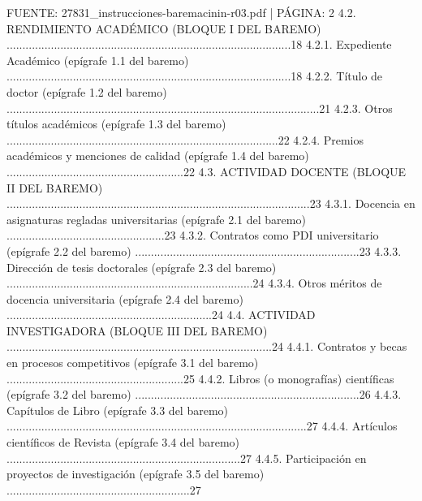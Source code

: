 \documentclass{article}
\begin{document}
\begin{itemize}
\begin{itemize}
\begin{scriptsize}
                  FUENTE: 27831\_instrucciones-baremacinin-r03.pdf | PÁGINA: 2
                  4.2. RENDIMIENTO ACADÉMICO (BLOQUE I DEL BAREMO) ..........................................................................................18
                  4.2.1. Expediente Académico (epígrafe 1.1 del baremo) ..........................................................................................18
                  4.2.2. Título de doctor (epígrafe 1.2 del baremo) ...................................................................................................21
                  4.2.3. Otros títulos académicos (epígrafe 1.3 del baremo) ......................................................................................22
                  4.2.4. Premios académicos y menciones de calidad (epígrafe 1.4 del baremo) ........................................................22
                  4.3. ACTIVIDAD DOCENTE (BLOQUE II DEL BAREMO) ................................................................................................23
                  4.3.1. Docencia en asignaturas regladas universitarias (epígrafe 2.1 del baremo) ..................................................23
                  4.3.2. Contratos como PDI universitario (epígrafe 2.2 del baremo) .......................................................................23
                  4.3.3. Dirección de tesis doctorales (epígrafe 2.3 del baremo) ..............................................................................24
                  4.3.4. Otros méritos de docencia universitaria (epígrafe 2.4 del baremo) .................................................................24
                  4.4. ACTIVIDAD INVESTIGADORA (BLOQUE III DEL BAREMO) ....................................................................................24
                  4.4.1. Contratos y becas en procesos competitivos (epígrafe 3.1 del baremo) ........................................................25
                  4.4.2. Libros (o monografías) científicas (epígrafe 3.2 del baremo) .......................................................................26
                  4.4.3. Capítulos de Libro (epígrafe 3.3 del baremo) ...............................................................................................27
                  4.4.4. Artículos científicos de Revista (epígrafe 3.4 del baremo) ..........................................................................27
                  4.4.5. Participación en proyectos de investigación (epígrafe 3.5 del baremo) ..........................................................27

\end{scriptsize}
\end{itemize}
\end{itemize}
\end{document}
